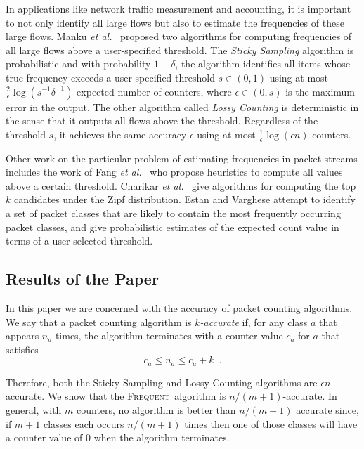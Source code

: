 \documentclass[charterfonts,lotsofwhite]{patmorin}
\newcommand{\frequent}{\textsc{Frequent}}
\newcommand{\etal}{\emph{et al.}}
\begin{document}
In applications like network traffic measurement and accounting, it is
important to not only identify all large flows but also to estimate the 
frequencies of these large flows. Manku \etal\ \cite{mm02} proposed two 
algorithms for 
computing frequencies of all large flows above a user-specified threshold. 
The {\it Sticky Sampling} algorithm is probabilistic and with 
probability $1-\delta$, the algorithm identifies all items whose true 
frequency exceeds a user specified threshold $s \in (0,1) $ using at most 
$\frac{2}{\epsilon} \log(s^{-1} \delta ^ {-1})$ expected number 
of counters, where $\epsilon \in (0,s)$ is the maximum error in the output. 
The other algorithm called {\it Lossy Counting} is deterministic in the 
sense that it outputs all flows above the threshold. Regardless of the 
threshold $s$, it achieves the same accuracy $\epsilon $ using at most 
$\frac{1}{\epsilon} \log (\epsilon n)$ counters.



Other work on the particular problem of estimating frequencies in
packet streams includes the work of Fang \etal\ \cite{fsgm98} who
propose heuristics to compute all values above a certain threshold.
Charikar \etal\ \cite{ccf02} give algorithms for computing the top $k$
candidates under the Zipf distribution.  Estan and Varghese
\cite{ev01} attempt to identify a set of packet classes that are
likely to contain the most frequently occurring packet classes, and
give probabilistic estimates of the expected count value in terms of a
user selected threshold.

\subsection{Results of the Paper}


In this paper we are concerned with the accuracy of packet counting
algorithms.  We say that a packet counting algorithm is
\emph{$k$-accurate} if, for any class $a$ that appears $n_a$ times,
the algorithm terminates with a counter value $c_a$ for $a$ that
satisfies
\begin{equation}
c_a\le n_a\le c_a+k \enspace . \label{accuracy}
\end{equation}  

Therefore, both the Sticky Sampling and Lossy Counting algorithms are
$\epsilon n$-accurate. We show that the \frequent\ algorithm is 
$n/(m+1)$-accurate. In general, with $m$ counters, no algorithm is 
better than $n/(m+1)$ accurate since, if $m+1$ classes each occurs 
$n/(m+1)$ times then one of those classes will have a counter value 
of $0$ when the algorithm terminates.
\end{document}
